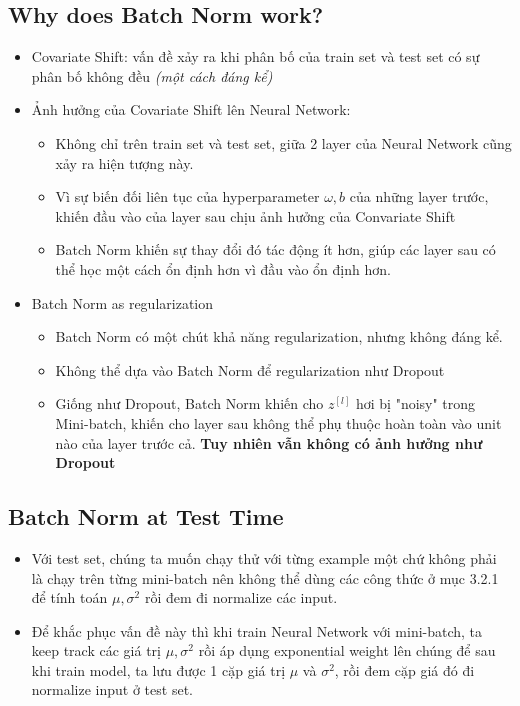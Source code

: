\documentclass[12pt,a4paper]{report}
\begin{document}
		\subsection{Why does Batch Norm work?}
			\begin{itemize}
				\item Covariate Shift: vấn đề xảy ra khi phân bố của train set 
				và test set có sự phân bố không đều \textit{(một cách đáng kể)}
				\item Ảnh hưởng của Covariate Shift lên Neural Network:
					\begin{itemize}
						\item Không chỉ trên train set và test set, giữa 2 
						layer của Neural Network cũng xảy ra hiện tượng này.
						\item Vì sự biến đối liên tục của hyperparameter $ 
						\omega, b $ của những layer trước, khiến đầu vào của 
						layer sau chịu ảnh hưởng của Convariate Shift
						\item Batch Norm khiến sự thay đổi đó tác động ít hơn, 
						giúp các layer sau có thể học một cách ổn định hơn vì 
						đầu vào ổn định hơn.
					\end{itemize}
				\item Batch Norm as regularization
					\begin{itemize}
						\item Batch Norm có một chút khả năng regularization, 
						nhưng không đáng kể.
						\item Không thể dựa vào Batch Norm để regularization 
						như Dropout
						\item Giống như Dropout, Batch Norm khiến cho $ z^{[l]} 
						$ hơi bị "noisy" trong Mini-batch, khiến cho layer sau 
						không thể phụ thuộc hoàn toàn vào unit nào của layer 
						trước cả. 	
						\textbf{Tuy nhiên vẫn không có ảnh hưởng như Dropout}
					\end{itemize}										
			\end{itemize}
		\subsection{Batch Norm at Test Time}
			\begin{itemize}
				\item Với test set, chúng ta muốn chạy thử với từng example một 
				chứ không phải là chạy trên từng mini-batch nên không thể dùng 	
				các công thức ở mục 3.2.1 để tính toán $ \mu, \sigma^2 $ rồi 
				đem đi normalize các input.
				\item Để khắc phục vấn đề này thì khi train Neural Network với 
				mini-batch, ta keep track các giá trị $ \mu, \sigma^2 $ rồi áp 
				dụng exponential weight lên chúng để sau khi train model, ta 
				lưu được 1 cặp giá trị $ \mu $ và $ \sigma^2 $, rồi đem cặp giá 
				đó đi normalize input ở test set.
			\end{itemize}
\end{document}
